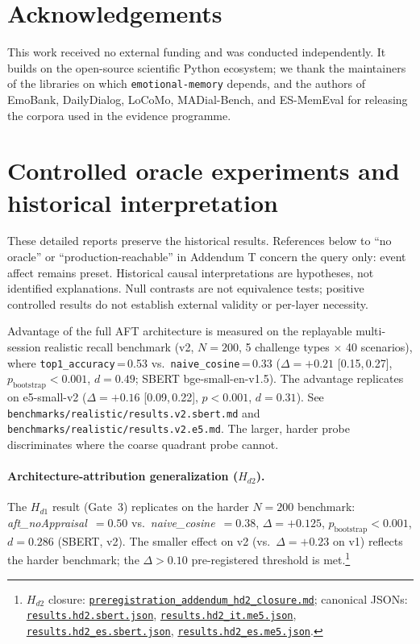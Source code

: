 \documentclass[11pt]{article}
\newcommand{\repourl}{https://github.com/gianlucamazza/emotional-memory}%
\begin{document}
\section*{Acknowledgements}
This work received no external funding and was conducted independently.
It builds on the open-source scientific Python ecosystem; we thank the
maintainers of the libraries on which \texttt{emotional-memory} depends, and
the authors of EmoBank, DailyDialog, LoCoMo, MADial-Bench, and ES-MemEval for releasing the
corpora used in the evidence programme.

\appendix
\section{Controlled oracle experiments and historical interpretation}
\label{sec:oracle_reference}
These detailed reports preserve the historical results. References below to
``no oracle'' or ``production-reachable'' in Addendum T concern the query only:
event affect remains preset. Historical causal interpretations are hypotheses,
not identified explanations. Null contrasts are not equivalence tests; positive
controlled results do not establish external validity or per-layer necessity.

Advantage of the full AFT architecture is measured on the replayable multi-session
realistic recall benchmark (v2, $N=200$, 5 challenge types $\times$ 40 scenarios),
where \texttt{top1\_accuracy}\,=\,0.53 vs.\ \texttt{naive\_cosine}\,=\,0.33
($\Delta=+0.21$ [0.15,\,0.27], $p_{\text{bootstrap}}<0.001$, $d=0.49$; SBERT
bge-small-en-v1.5). The advantage replicates on e5-small-v2
($\Delta=+0.16$ [0.09,\,0.22], $p<0.001$, $d=0.31$).
See \texttt{benchmarks/realistic/results.v2.sbert.md} and
\texttt{benchmarks/realistic/results.v2.e5.md}.
The larger, harder probe discriminates where the coarse quadrant probe cannot.

\paragraph{Architecture-attribution generalization ($H_{d2}$).}
The $H_{d1}$ result (Gate~3) replicates on the harder $N=200$ benchmark:
\textit{aft\_noAppraisal}~$=0.50$ vs.\ \textit{naive\_cosine}~$=0.38$,
$\Delta=+0.125$, $p_{\text{bootstrap}}<0.001$, $d=0.286$ (SBERT, v2).
The smaller effect on v2 (vs.\ $\Delta=+0.23$ on v1) reflects the harder
benchmark; the $\Delta>0.10$ pre-registered threshold is met.\footnote{$H_{d2}$ closure:
\href{\repourl/blob/main/benchmarks/preregistration\_addendum\_hd2\_closure.md}%
{\texttt{preregistration\_addendum\_hd2\_closure.md}};
canonical JSONs:
\href{\repourl/blob/main/benchmarks/appraisal\_confound/results.hd2.sbert.json}%
{\texttt{results.hd2.sbert.json}},
\href{\repourl/blob/main/benchmarks/appraisal\_confound/results.hd2\_it.me5.json}%
{\texttt{results.hd2\_it.me5.json}},
\href{\repourl/blob/main/benchmarks/appraisal\_confound/results.hd2\_es.sbert.json}%
{\texttt{results.hd2\_es.sbert.json}},
\href{\repourl/blob/main/benchmarks/appraisal\_confound/results.hd2\_es.me5.json}%
{\texttt{results.hd2\_es.me5.json}}.}
\end{document}
